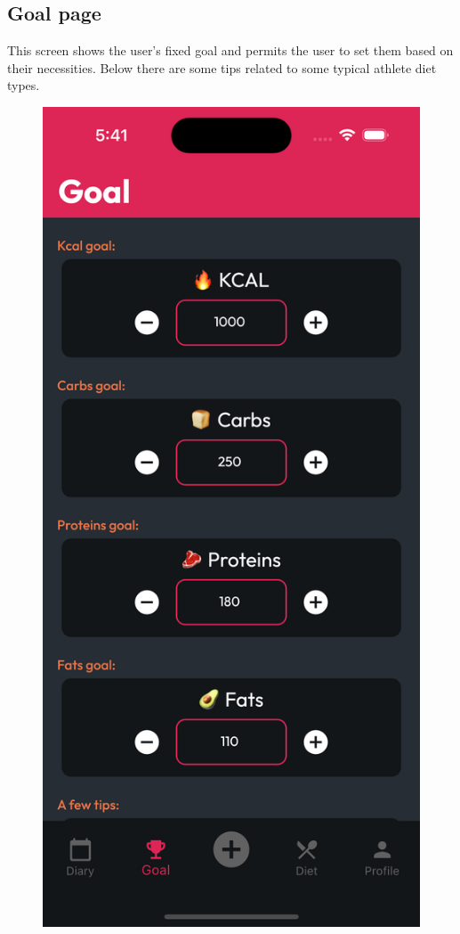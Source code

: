 \documentclass{Configuration_Files/PoliMi3i_thesis}
\begin{document}
\subsection{Goal page}

\begin{minipage}{\linewidth}
    This screen shows the user's fixed goal and permits the user to set them based on their necessities. Below there are some tips related to some typical athlete diet types.
\end{minipage}

\begin{figure}[!h]
  \centering
  \includegraphics[scale=0.1]{Images/Screenshots/Mobile/Goal1.png}

\end{figure}
\end{document}
